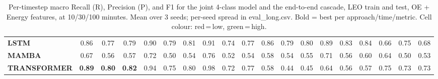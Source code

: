 \begin{table}[t]
{\begin{tabular}{l ccc ccc ccc ccc ccc ccc}
\textbf{LSTM} & \cellcolor[HTML]{51CF66}0.86 & \cellcolor[HTML]{51CF66}0.77 & \cellcolor[HTML]{51CF66}0.79 & \cellcolor[HTML]{51CF66}0.90 & \cellcolor[HTML]{51CF66}0.79 & \cellcolor[HTML]{51CF66}0.81 & \cellcolor[HTML]{51CF66}0.91 & \cellcolor[HTML]{58CF64}0.74 & \cellcolor[HTML]{51CF66}0.77 & \cellcolor[HTML]{51CF66}0.86 & \cellcolor[HTML]{51CF66}0.79 & \cellcolor[HTML]{51CF66}0.80 & \cellcolor[HTML]{51CF66}0.89 & \cellcolor[HTML]{51CF66}0.83 & \cellcolor[HTML]{51CF66}0.84 & \cellcolor[HTML]{93D156}0.66 & \cellcolor[HTML]{53CF66}0.75 & \cellcolor[HTML]{84D059}0.68 \\
\textbf{MAMBA} & \cellcolor[HTML]{87D159}0.67 & \cellcolor[HTML]{D5D345}0.56 & \cellcolor[HTML]{CDD347}0.57 & \cellcolor[HTML]{65D061}0.72 & \cellcolor[HTML]{FCD43C}0.50 & \cellcolor[HTML]{E2D342}0.54 & \cellcolor[HTML]{51CF66}0.76 & \cellcolor[HTML]{F1D43E}0.52 & \cellcolor[HTML]{E3D342}0.54 & \cellcolor[HTML]{C4D249}0.58 & \cellcolor[HTML]{E5D341}0.54 & \cellcolor[HTML]{DBD344}0.55 & \cellcolor[HTML]{6CD05F}0.71 & \cellcolor[HTML]{D3D346}0.56 & \cellcolor[HTML]{BBD24C}0.60 & \cellcolor[HTML]{9BD154}0.64 & \cellcolor[HTML]{FCD43C}0.50 & \cellcolor[HTML]{EBD340}0.53 \\
\textbf{TRANSFORMER} & \cellcolor[HTML]{51CF66}\textbf{0.89} & \cellcolor[HTML]{51CF66}\textbf{0.80} & \cellcolor[HTML]{51CF66}\textbf{0.82} & \cellcolor[HTML]{51CF66}0.94 & \cellcolor[HTML]{53CF66}0.75 & \cellcolor[HTML]{51CF66}0.80 & \cellcolor[HTML]{51CF66}0.98 & \cellcolor[HTML]{64D061}0.72 & \cellcolor[HTML]{51CF66}0.77 & \cellcolor[HTML]{C7D249}0.58 & \cellcolor[HTML]{FFBC46}0.44 & \cellcolor[HTML]{FFBE45}0.45 & \cellcolor[HTML]{A0D152}0.64 & \cellcolor[HTML]{D5D345}0.56 & \cellcolor[HTML]{D1D346}0.57 & \cellcolor[HTML]{53CF66}0.75 & \cellcolor[HTML]{5CCF63}0.73 & \cellcolor[HTML]{5CCF63}0.73 \\
\bottomrule
\end{tabular}%
}
\caption{Per-timestep macro Recall (R), Precision (P), and F1 for the joint 4-class model and the end-to-end cascade, LEO train and test, OE + Energy features, at 10/30/100 minutes. Mean over 3 seeds; per-seed spread in eval\_long.csv. Bold = best per approach/time/metric. Cell colour: red\,=\,low, green\,=\,high.}
\label{tab:seq_leo_phys_jc}
\end{table}
